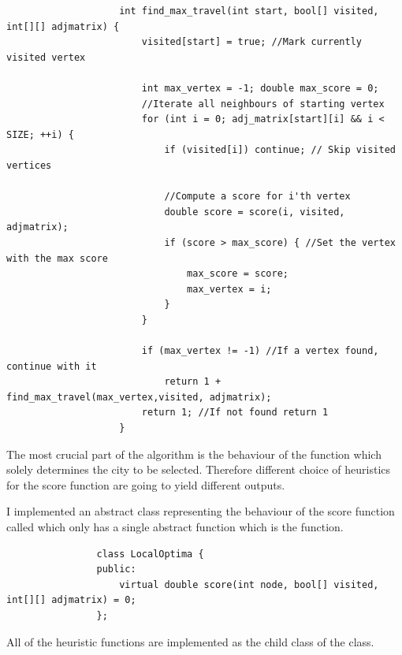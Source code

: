 \documentclass[12pt]{report}
\begin{document}
            \begin{verbatim}
                    int find_max_travel(int start, bool[] visited, int[][] adjmatrix) {
                        visited[start] = true; //Mark currently visited vertex

                        int max_vertex = -1; double max_score = 0;
                        //Iterate all neighbours of starting vertex
                        for (int i = 0; adj_matrix[start][i] && i < SIZE; ++i) {
                            if (visited[i]) continue; // Skip visited vertices

                            //Compute a score for i'th vertex
                            double score = score(i, visited, adjmatrix); 
                            if (score > max_score) { //Set the vertex with the max score
                                max_score = score;
                                max_vertex = i;
                            }
                        }

                        if (max_vertex != -1) //If a vertex found, continue with it
                            return 1 + find_max_travel(max_vertex,visited, adjmatrix);
                        return 1; //If not found return 1
                    }
            \end{verbatim}

            The most crucial part of the algorithm is the behaviour of the  function which solely determines the city to be selected. Therefore different choice of heuristics 
            for the score function are going to yield different outputs. 
            
            I implemented an abstract class representing the behaviour of the score function called  which only has
            a single abstract function which is the  function. 

            \begin{verbatim}
                class LocalOptima {
                public:
                    virtual double score(int node, bool[] visited, int[][] adjmatrix) = 0;
                };
            \end{verbatim}

            All of the heuristic functions are implemented as the child class of the  class.
\end{document}
